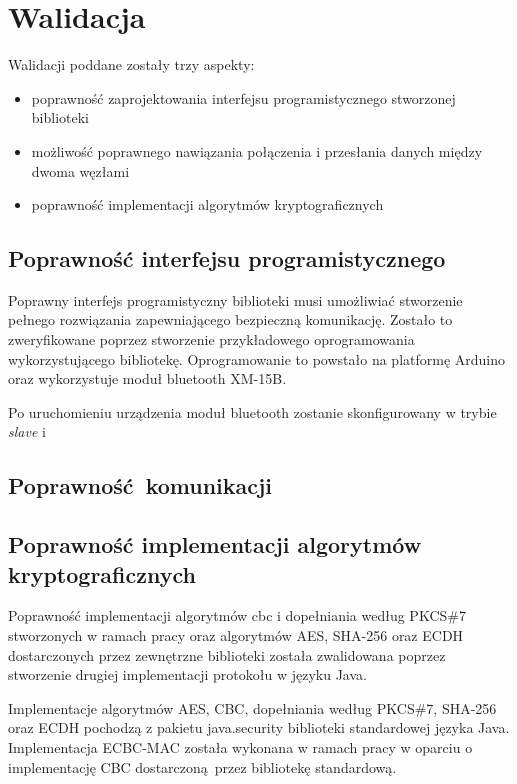 \chapter{Walidacja}
\label{cha:walidacja}

Walidacji poddane zostały trzy aspekty:

\begin{itemize}
\item poprawność zaprojektowania interfejsu programistycznego stworzonej biblioteki
\item możliwość poprawnego nawiązania połączenia i przesłania danych między dwoma węzłami
\item poprawność implementacji algorytmów kryptograficznych
\end{itemize}

\section{Poprawność interfejsu programistycznego}

Poprawny interfejs programistyczny biblioteki musi umożliwiać stworzenie pełnego rozwiązania zapewniającego bezpieczną komunikację. Zostało to zweryfikowane poprzez stworzenie przykładowego oprogramowania wykorzystującego bibliotekę. Oprogramowanie to powstało na platformę Arduino oraz wykorzystuje moduł bluetooth XM-15B.

Po uruchomieniu urządzenia moduł bluetooth zostanie skonfigurowany w trybie \emph{slave} i 

\section{Poprawność komunikacji}

\section{Poprawność implementacji algorytmów kryptograficznych}

Poprawność implementacji algorytmów \gls{cbc} i dopełniania według PKCS\#7 stworzonych w ramach pracy oraz algorytmów AES, SHA-256 oraz ECDH dostarczonych przez zewnętrzne biblioteki została zwalidowana poprzez stworzenie drugiej implementacji protokołu w języku Java.

Implementacje algorytmów AES, CBC, dopełniania według PKCS\#7, SHA-256 oraz ECDH pochodzą z pakietu java.security biblioteki standardowej języka Java. Implementacja ECBC-MAC została wykonana w ramach pracy w oparciu o implementację CBC dostarczoną przez bibliotekę standardową.
